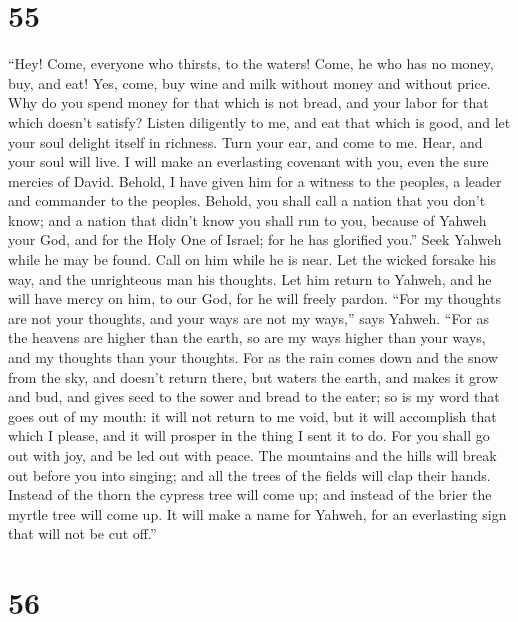 \hypertarget{section-51}{%
\section{55}\label{section-51}}

 ``Hey! Come, everyone who thirsts, to the waters! Come, he
who has no money, buy, and eat! Yes, come, buy wine and milk without
money and without price.  Why do you spend money for that
which is not bread, and your labor for that which doesn't satisfy?
Listen diligently to me, and eat that which is good, and let your soul
delight itself in richness.  Turn your ear, and come to me.
Hear, and your soul will live. I will make an everlasting covenant with
you, even the sure mercies of David.  Behold, I have given
him for a witness to the peoples, a leader and commander to the peoples.
 Behold, you shall call a nation that you don't know; and a
nation that didn't know you shall run to you, because of Yahweh your
God, and for the Holy One of Israel; for he has glorified you.''
 Seek Yahweh while he may be found. Call on him while he is
near.  Let the wicked forsake his way, and the unrighteous
man his thoughts. Let him return to Yahweh, and he will have mercy on
him, to our God, for he will freely pardon.  ``For my
thoughts are not your thoughts, and your ways are not my ways,'' says
Yahweh.  ``For as the heavens are higher than the earth, so
are my ways higher than your ways, and my thoughts than your thoughts.
 For as the rain comes down and the snow from the sky, and
doesn't return there, but waters the earth, and makes it grow and bud,
and gives seed to the sower and bread to the eater;  so is
my word that goes out of my mouth: it will not return to me void, but it
will accomplish that which I please, and it will prosper in the thing I
sent it to do.  For you shall go out with joy, and be led
out with peace. The mountains and the hills will break out before you
into singing; and all the trees of the fields will clap their hands.
 Instead of the thorn the cypress tree will come up; and
instead of the brier the myrtle tree will come up. It will make a name
for Yahweh, for an everlasting sign that will not be cut off.''

\hypertarget{section-52}{%
\section{56}\label{section-52}}

